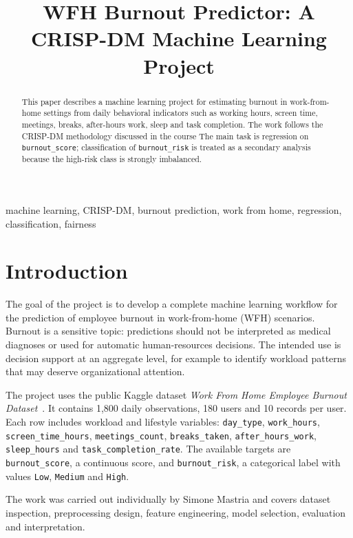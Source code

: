 \documentclass[conference]{IEEEtran}
\title{WFH Burnout Predictor: A CRISP-DM Machine Learning Project}
\author{
\IEEEauthorblockN{Simone Mastria}
\IEEEauthorblockA{Machine Learning and Data Mining, Module 2\\
University of Bologna\\
Email: simone.mastria@studenti.unibo.it}
}
\begin{document}
\maketitle

\begin{abstract}
This paper describes a machine learning project for estimating burnout in
work-from-home settings from daily behavioral indicators such as working hours,
screen time, meetings, breaks, after-hours work, sleep and task completion. The
work follows the CRISP-DM methodology discussed in the course The main task is regression
on \texttt{burnout\_score}; classification of \texttt{burnout\_risk} is treated
as a secondary analysis because the high-risk class is strongly imbalanced.
\end{abstract}

\begin{IEEEkeywords}
machine learning, CRISP-DM, burnout prediction, work from home, regression,
classification, fairness
\end{IEEEkeywords}

\section{Introduction}

The goal of the project is to develop a complete machine learning workflow for the
prediction of employee burnout in work-from-home (WFH) scenarios. Burnout is a
sensitive topic: predictions should not be interpreted as medical diagnoses or
used for automatic human-resources decisions. The intended use is decision
support at an aggregate level, for example to identify workload patterns that may
deserve organizational attention.

The project uses the public Kaggle dataset \emph{Work From Home Employee Burnout
Dataset}~\cite{kaggle}. It contains 1,800 daily observations, 180 users and 10
records per user. Each row includes workload and lifestyle variables:
\texttt{day\_type}, \texttt{work\_hours}, \texttt{screen\_time\_hours},
\texttt{meetings\_count}, \texttt{breaks\_taken},
\texttt{after\_hours\_work}, \texttt{sleep\_hours} and
\texttt{task\_completion\_rate}. The available targets are
\texttt{burnout\_score}, a continuous score, and \texttt{burnout\_risk}, a
categorical label with values \texttt{Low}, \texttt{Medium} and \texttt{High}.

The work was carried out individually by Simone Mastria and covers dataset
inspection, preprocessing design, feature engineering, model selection,
evaluation and interpretation.
\end{document}
